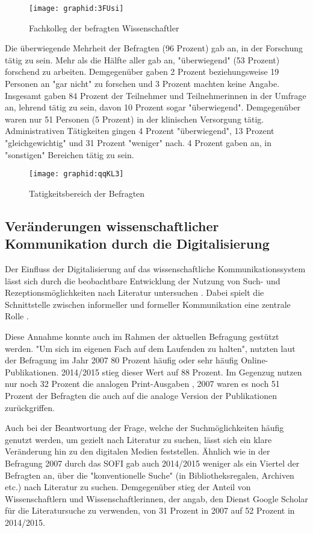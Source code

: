 \begin{figure}[h!]
\texttt{[image: graphid:3FUsi]}
\caption{Fachkolleg der befragten Wissenschaftler}
\end{figure}

Die überwiegende Mehrheit der Befragten (96 Prozent) gab an, in der Forschung tätig zu sein. Mehr als die Hälfte aller gab an, "überwiegend" (53 Prozent) forschend zu arbeiten. Demgegenüber gaben 2 Prozent beziehungsweise 19 Personen an "gar nicht" zu forschen und 3 Prozent machten keine Angabe. Insgesamt gaben 84 Prozent der Teilnehmer und Teilnehmerinnen in der Umfrage an, lehrend tätig zu sein, davon 10 Prozent sogar "überwiegend". Demgegenüber waren nur 51 Personen (5 Prozent) in der klinischen Versorgung tätig. Administrativen Tätigkeiten gingen 4 Prozent "überwiegend", 13 Prozent "gleichgewichtig" und 31 Prozent "weniger" nach. 4 Prozent gaben an, in "sonstigen" Bereichen tätig zu sein.

\begin{figure}[h!]
\texttt{[image: graphid:qqKL3]}
\caption{Tatigkeitsbereich der Befragten}
\end{figure}

\subsection{Veränderungen wissenschaftlicher Kommunikation durch die Digitalisierung}

Der Einfluss der Digitalisierung auf das wissenschaftliche Kommunikationssystem lässt sich durch die beobachtbare Entwicklung der Nutzung von Such- und Rezeptionsmöglichkeiten nach Literatur untersuchen \cite{Hanekop_2014}. Dabei spielt die Schnittstelle zwischen informeller und formeller Kommunikation eine zentrale Rolle \cite{Hanekop_2014}.

Diese Annahme konnte auch im Rahmen der aktuellen Befragung gestützt werden. "Um sich im eigenen Fach auf dem Laufenden zu halten", nutzten laut der Befragung im Jahr 2007 80 Prozent häufig oder sehr häufig Online-Publikationen. 2014/2015 stieg dieser Wert auf 88 Prozent. Im Gegenzug nutzen nur noch 32 Prozent die analogen Print-Ausgaben , 2007 waren es noch 51 Prozent der Befragten die auch auf die analoge Version der Publikationen zurückgriffen.

Auch bei der Beantwortung der Frage, welche der Suchmöglichkeiten häufig genutzt werden, um gezielt nach Literatur zu suchen, lässt sich ein klare Veränderung hin zu den digitalen Medien feststellen. Ähnlich wie in der Befragung 2007 durch das SOFI gab auch 2014/2015 weniger als ein Viertel der Befragten an, über die "konventionelle Suche" (in Bibliotheksregalen, Archiven etc.) nach Literatur zu suchen. Demgegenüber stieg der Anteil von Wissenschaftlern und Wissenschaftlerinnen, der angab, den Dienst Google Scholar für die Literatursuche zu verwenden, von 31 Prozent in 2007 auf 52 Prozent in 2014/2015.

